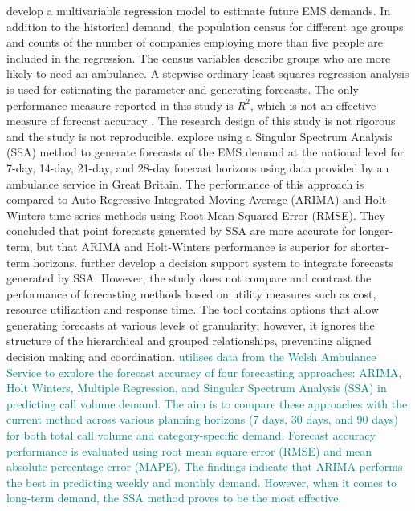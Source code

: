 \documentclass[
  authoryear,
  preprint,
  3p]{elsarticle}
\begin{document}
\citet{sasaki2010using} develop a multivariable regression model to
estimate future EMS demands. In addition to the historical demand, the
population census for different age groups and counts of the number of
companies employing more than five people are included in the
regression. The census variables describe groups who are more likely to
need an ambulance. A stepwise ordinary least squares regression analysis
is used for estimating the parameter and generating forecasts. The only
performance measure reported in this study is \(R^2\), which is not an
effective measure of forecast accuracy \citep[p457]{armstrong01}. The
research design of this study is not rigorous and the study is not
reproducible. \citet{vile2012predicting} explore using a Singular
Spectrum Analysis (SSA) method to generate forecasts of the EMS demand
at the national level for 7-day, 14-day, 21-day, and 28-day forecast
horizons using data provided by an ambulance service in Great Britain.
The performance of this approach is compared to Auto-Regressive
Integrated Moving Average (ARIMA) and Holt-Winters time series methods
using Root Mean Squared Error (RMSE). They concluded that point
forecasts generated by SSA are more accurate for longer-term, but that
ARIMA and Holt-Winters performance is superior for shorter-term
horizons. \citet{vile2016time} further develop a decision support system
to integrate forecasts generated by SSA. However, the study does not
compare and contrast the performance of forecasting methods based on
utility measures such as cost, resource utilization and response time.
The tool contains options that allow generating forecasts at various
levels of granularity; however, it ignores the structure of the
hierarchical and grouped relationships, preventing aligned decision
making and coordination. \citet{al2021empirical}
\textcolor{teal}{utilises data from the Welsh Ambulance Service to explore the forecast accuracy of four forecasting approaches: ARIMA, Holt Winters, Multiple Regression, and Singular Spectrum Analysis (SSA) in predicting call volume demand. The aim is to compare these approaches with the current method across various planning horizons (7 days, 30 days, and 90 days) for both total call volume and category-specific demand. Forecast accuracy performance is evaluated using root mean square error (RMSE) and mean absolute percentage error (MAPE). The findings indicate that ARIMA performs the best in predicting weekly and monthly demand. However, when it comes to long-term demand, the SSA method proves to be the most effective.}
\citet{ibrahim2016modeling}
\end{document}
